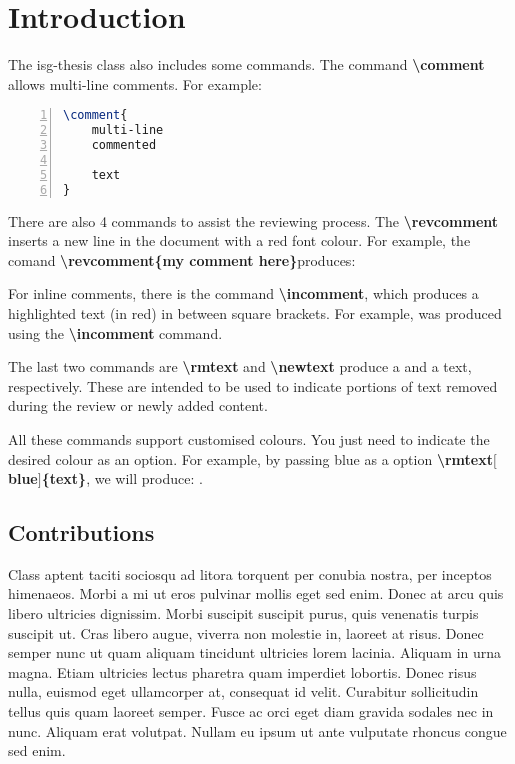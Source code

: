 \chapter{Introduction}\label{Introduction_chapter}

The isg-thesis class also includes some commands. The command \textbf{\textbackslash{comment}} allows multi-line comments. For example:

\begin{lstlisting}[frame=single,
					frameround=tttt,
					rulecolor=\color{black},
					language=TeX,
					basicstyle=\small,
					backgroundcolor=\color{black!10},
					numbers=left,
					numberstyle=\small\color{gray},
					xleftmargin=50pt,
					xrightmargin=50pt,
					framextopmargin=2pt,
					framexrightmargin=3pt,
					framexleftmargin=3pt,
					framexbottommargin=2pt,
				]
\comment{
    multi-line
    commented
    
    text
}
\end{lstlisting}

There are also 4 commands to assist the reviewing process. The \textbf{\textbackslash{revcomment}} inserts a new line in the document with a red font colour. For example, the comand \textbf{\textbackslash{revcomment}\{my comment here\}}produces:


For inline comments, there is the command \textbf{\textbackslash{incomment}}, which produces a highlighted text (in red) in between square brackets. For example,  was produced using the \textbf{\textbackslash{incomment}} command.

The last two commands are \textbf{\textbackslash{rmtext}} and \textbf{\textbackslash{newtext}} produce a  and a  text, respectively. These are intended to be used to indicate portions of text removed during the review or newly added content.

All these commands support customised colours. You just need to indicate the desired colour as an option. For example, by passing blue as a option \textbf{\textbackslash{rmtext}$[$blue$]$\{text\}}, we will produce: .

\section{Contributions}

Class aptent taciti sociosqu ad litora torquent per conubia nostra, per inceptos himenaeos. Morbi a mi ut eros pulvinar mollis eget sed enim. Donec at arcu quis libero ultricies dignissim. Morbi suscipit suscipit purus, quis venenatis turpis suscipit ut. Cras libero augue, viverra non molestie in, laoreet at risus. Donec semper nunc ut quam aliquam tincidunt ultricies lorem lacinia. Aliquam in urna magna. Etiam ultricies lectus pharetra quam imperdiet lobortis. Donec risus nulla, euismod eget ullamcorper at, consequat id velit. Curabitur sollicitudin tellus quis quam laoreet semper. Fusce ac orci eget diam gravida sodales nec in nunc. Aliquam erat volutpat. Nullam eu ipsum ut ante vulputate rhoncus congue sed enim.

